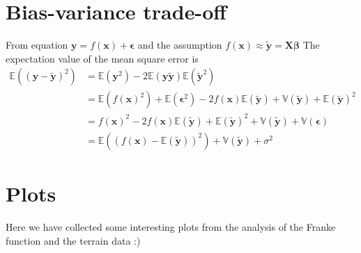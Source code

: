 \section{Bias-variance trade-off}\label{sec:appendix_b}
\noindent From equation $\boldsymbol{y} = f(\boldsymbol{x}) + \boldsymbol{\epsilon}$ and the assumption $f(\boldsymbol{x}) \approx \boldsymbol{\tilde{y}} = \boldsymbol{X \beta}$
The expectation value of the mean square error is 
\begin{align*}
	\mathbb{E}((\boldsymbol{y} - \boldsymbol{\tilde{y}})^{2}) &= \mathbb{E}(\boldsymbol{y}^{2}) - 2 \mathbb{E}(\boldsymbol{y} \boldsymbol{\tilde{y}}) \mathbb{E}(\boldsymbol{\tilde{y}}^{2}) \\
	&= \mathbb{E}(f(\boldsymbol{x})^{2}) + \mathbb{E}(\boldsymbol{\epsilon}^{2}) - 2 f(\boldsymbol{x}) \mathbb{E}(\boldsymbol{\tilde{y}}) + \mathbb{V}(\boldsymbol{\tilde{y}}) + \mathbb{E}(\boldsymbol{\tilde{y}})^{2} \\
	&= f(\boldsymbol{x})^{2} - 2 f(\boldsymbol{x}) \mathbb{E}(\boldsymbol{\tilde{y}}) + \mathbb{E}(\boldsymbol{\tilde{y}})^{2} + \mathbb{V}(\boldsymbol{\tilde{y}}) + \mathbb{V}(\boldsymbol{\epsilon}) \\
	&= \mathbb{E}((f(\boldsymbol{x}) - \mathbb{E}(\boldsymbol{\tilde{y}}))^{2}) + \mathbb{V}(\boldsymbol{\tilde{y}}) + \sigma^{2}
\end{align*}

\newpage
\section{Plots}\label{sec:appendix_c}
Here we have collected some interesting plots from the analysis of the Franke function and the terrain data :)
%
